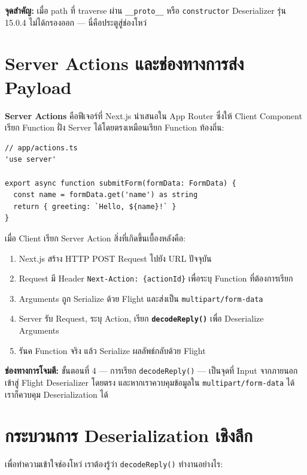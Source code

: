 \documentclass[12pt,oneside]{report}
\begin{document}
\textbf{จุดสำคัญ:} เมื่อ path ที่ traverse ผ่าน \texttt{\_\_proto\_\_} หรือ \texttt{constructor} Deserializer รุ่น 15.0.4 ไม่ได้กรองออก --- นี่คือประตูสู่ช่องโหว่

\section{Server Actions และช่องทางการส่ง Payload}

\textbf{Server Actions} คือฟีเจอร์ที่ Next.js นำเสนอใน App Router ซึ่งให้ Client Component เรียก Function ฝั่ง Server ได้โดยตรงเหมือนเรียก Function ท้องถิ่น:

\begin{lstlisting}[language={[Sharp]C}, caption=ตัวอย่าง Server Action ใน Next.js]
// app/actions.ts
'use server'

export async function submitForm(formData: FormData) {
  const name = formData.get('name') as string
  return { greeting: `Hello, ${name}!` }
}
\end{lstlisting}

\newpage

เมื่อ Client เรียก Server Action สิ่งที่เกิดขึ้นเบื้องหลังคือ:

\begin{enumerate}
    \item Next.js สร้าง HTTP POST Request ไปยัง URL ปัจจุบัน
    \item Request มี Header \texttt{Next-Action: \{actionId\}} เพื่อระบุ Function ที่ต้องการเรียก
    \item Arguments ถูก Serialize ด้วย Flight และส่งเป็น \texttt{multipart/form-data}
    \item Server รับ Request, ระบุ Action, เรียก \textbf{\texttt{decodeReply()}} เพื่อ Deserialize Arguments
    \item รันค Function จริง แล้ว Serialize ผลลัพธ์กลับด้วย Flight
\end{enumerate}

\textbf{ช่องทางการโจมตี:} ขั้นตอนที่ 4 — การเรียก \texttt{decodeReply()} — เป็นจุดที่ Input จากภายนอกเข้าสู่ Flight Deserializer โดยตรง และหากเราควบคุมข้อมูลใน \texttt{multipart/form-data} ได้ เราก็ควบคุม Deserialization ได้

\section{กระบวนการ Deserialization เชิงลึก}

เพื่อทำความเข้าใจช่องโหว่ เราต้องรู้ว่า \texttt{decodeReply()} ทำงานอย่างไร:
\end{document}
